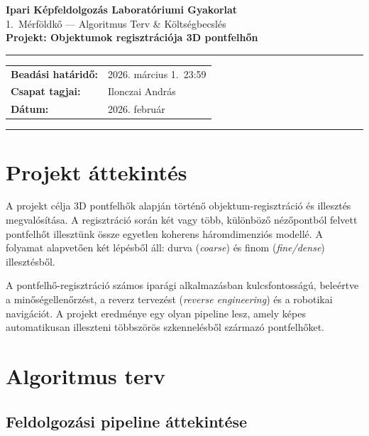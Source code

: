 \documentclass[12pt,a4paper]{article}
\begin{document}
\begin{center}
  {\LARGE\bfseries\color{accentblue} Ipari Képfeldolgozás Laboratóriumi Gyakorlat}\\[0.4em]
  {\large 1.\ Mérföldkő --- Algoritmus Terv \& Költségbecslés}\\[1.2em]
  {\large\bfseries Projekt: Objektumok regisztrációja 3D pontfelhőn}\\[1em]
  \hrule
  \vspace{0.8em}
  \begin{tabular}{ll}
    \textbf{Beadási határidő:} & 2026. március 1.\ 23:59 \\
    \textbf{Csapat tagjai:}    & Ilonczai András \\
    \textbf{Dátum:}            & 2026. február \\
  \end{tabular}
  \vspace{0.8em}
  \hrule
\end{center}

\vspace{1em}

\section{Projekt áttekintés}

A projekt célja 3D pontfelhők alapján történő objektum-regisztráció és illesztés megvalósítása. A regisztráció során két vagy több, különböző nézőpontból felvett pontfelhőt illesztünk össze egyetlen koherens háromdimenziós modellé. A folyamat alapvetően két lépésből áll: durva (\textit{coarse}) és finom (\textit{fine/dense}) illesztésből.

A pontfelhő-regisztráció számos iparági alkalmazásban kulcsfontosságú, beleértve a minőségellenőrzést, a reverz tervezést (\textit{reverse engineering}) és a robotikai navigációt. A projekt eredménye egy olyan pipeline lesz, amely képes automatikusan illeszteni többszörös szkennelésből származó pontfelhőket.

\section{Algoritmus terv}

\subsection{Feldolgozási pipeline áttekintése}
\end{document}
